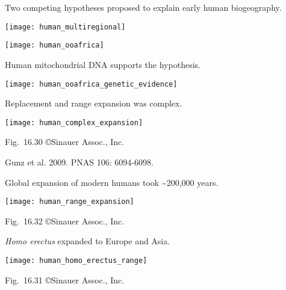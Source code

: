 \documentclass[t]{beamer}
\begin{document}
%
\begin{frame}[t]{Two competing hypotheses proposed to explain early human biogeography.}
\begin{multicols}{2}
	\texttt{[image: human\_multiregional]}

	\texttt{[image: human\_ooafrica]}
\end{multicols}
\end{frame}
%
\begin{frame}{Human mitochondrial DNA supports the  hypothesis.}
	\begin{center}
		\texttt{[image: human\_ooafrica\_genetic\_evidence]}
	\end{center}
\end{frame}
%
\begin{frame}[t]{Replacement and range expansion was complex.}
	\vspace{-\baselineskip}
	\begin{center}
		\texttt{[image: human\_complex\_expansion]}
	\end{center}

	\vfilll
	
	\hfill \tiny Fig.~16.30 \copyright Sinauer Assoc., Inc.
\end{frame}
%
{
\begin{frame}[b]{}

\hfill\tiny Gunz et al. 2009. PNAS 106: 6094-6098.
\end{frame}
}
%
\begin{frame}{Global expansion of modern humans took \textasciitilde{}200,000 years.}
	\vspace{-\baselineskip}
	\begin{center}
		\texttt{[image: human\_range\_expansion]}
	\end{center}

	\vfilll
	
	\hfill \tiny Fig.~16.32 \copyright Sinauer Assoc., Inc.
	
\end{frame}
%
\begin{frame}{\textit{Homo erectus} expanded to Europe and Asia.}
	\vspace{-\baselineskip}
	\begin{center}
		\texttt{[image: human\_homo\_erectus\_range]}
	\end{center}

	\vfilll
	\hfill \tiny Fig.~16.31 \copyright Sinauer Assoc., Inc.

\end{frame}
\end{document}
